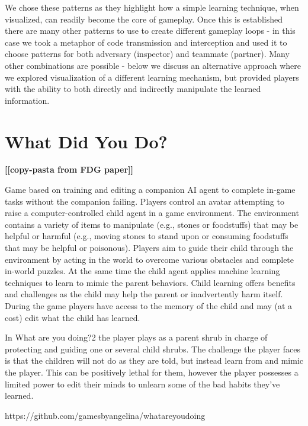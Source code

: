 \documentclass{sig-alternate}
\newcommand{\todo}[1]{\textbf{[[#1]]}}
\begin{document}
We chose these patterns as they highlight how a simple learning
technique, when visualized, can readily become the core of
gameplay. Once this is established there are many other patterns
to use to create different gameplay loops - in this case we took a
metaphor of code transmission and interception and used it to
choose patterns for both adversary (inspector) and teammate
(partner). Many other combinations are possible - below we
discuss an alternative approach where we explored visualization
of a different learning mechanism, but provided players with the
ability to both directly and indirectly manipulate the learned
information.

\section{{\sc What Did You Do?}}
\todo{copy-pasta from FDG paper}

Game based on training and editing a companion AI agent to complete in-game tasks without the companion failing.
Players control an avatar attempting to raise a computer-controlled child agent in a game environment.
The environment contains a variety of items to manipulate (e.g., stones or foodstuffs) that may be helpful or harmful (e.g., moving stones to stand upon or consuming foodstuffs that may be helpful or poisonous).
Players aim to guide their child through the environment by acting in the world to overcome various obstacles and complete in-world puzzles.
At the same time the child agent applies machine learning techniques to learn to mimic the parent behaviors.
Child learning offers benefits and challenges as the child may help the parent or inadvertently harm itself.
During the game players have access to the memory of the child and may (at a cost) edit what the child has learned.

In What are you doing?2 the player plays as a parent shrub in
charge of protecting and guiding one or several child shrubs. The
challenge the player faces is that the children will not do as they
are told, but instead learn from and mimic the player. This can be
positively lethal for them, however the player possesses a limited
power to edit their minds to unlearn some of the bad habits they've
learned.

https://github.com/gamesbyangelina/whatareyoudoing
\end{document}
